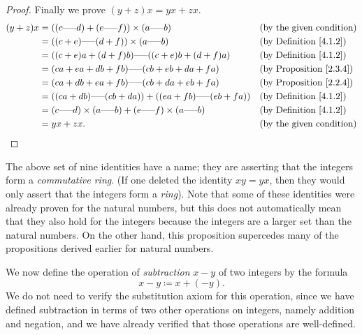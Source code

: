 \begin{proof}
    Finally we prove \((y + z)x = yx + zx\).
    \begin{align*}
        (y + z)x & = ((c \text{-----} d) + (e \text{-----} f)) \times (a \text{-----} b)                         &  & \text{(by the given condition)}     \\
                 & = ((c + e) \text{-----} (d + f)) \times (a \text{-----} b)                                    &  & \text{(by Definition \ref{4.1.2})}  \\
                 & = ((c + e)a + (d + f)b) \text{-----} ((c + e)b + (d + f)a)                                    &  & \text{(by Definition \ref{4.1.2})}  \\
                 & = (ca + ea + db + fb) \text{-----} (cb + eb + da + fa)                                        &  & \text{(by Proposition \ref{2.3.4})} \\
                 & = (ca + db + ea + fb) \text{-----} (cb + da + eb + fa)                                        &  & \text{(by Proposition \ref{2.2.4})} \\
                 & = ((ca + db) \text{-----} (cb + da)) + ((ea + fb) \text{-----} (eb + fa))                     &  & \text{(by Definition \ref{4.1.2})}  \\
                 & = (c \text{-----} d) \times (a \text{-----} b) + (e \text{-----} f) \times (a \text{-----} b) &  & \text{(by Definition \ref{4.1.2})}  \\
                 & = yx + zx.                                                                                    &  & \text{(by the given condition)}
    \end{align*}
\end{proof}

\begin{remark}\label{4.1.7}
    The above set of nine identities have a name; they are asserting that the integers form a \emph{commutative ring}.
    (If one deleted the identity \(xy = yx\), then they would only assert that the integers form a \emph{ring}).
    Note that some of these identities were already proven for the natural numbers, but this does not automatically mean that they also hold for the integers because the integers are a larger set than the natural numbers.
    On the other hand, this proposition supercedes many of the propositions derived earlier for natural numbers.
\end{remark}

\begin{note}
    We now define the operation of \emph{subtraction} \(x - y\) of two integers by the formula
    \[
        x - y \coloneqq x + (-y).
    \]
    We do not need to verify the substitution axiom for this operation, since we have defined subtraction in terms of two other operations on integers, namely addition and negation, and we have already verified that those operations are well-defined.
\end{note}

